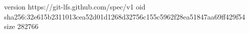 version https://git-lfs.github.com/spec/v1
oid sha256:32e615b2311013cea52d01d1268d32756c155c5962f28ea51847aa69ff429f54
size 282766
